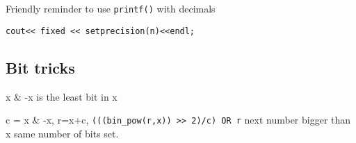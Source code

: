 \documentclass[10pt]{article}
\begin{document}
\begin{multicols*}{2}
Friendly reminder to use \texttt{printf()} with decimals

\begin{lstlisting}[style=compactcpp]
cout<< fixed << setprecision(n)<<endl;
\end{lstlisting}

\subsection{Bit tricks}

x \& -x is the least bit in x

c = x \& -x, r=x+c, \texttt{(((bin\_pow(r,x)) >> 2)/c) OR r}  next number bigger than x same number of bits set.

\end{multicols*}
\end{document}

